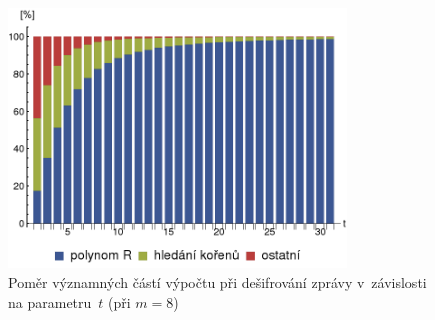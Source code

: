 \documentclass[thesis=M,czech,hidelinks]{FITthesis}[2012/06/26]
\newcommand{\0}{{\textcolor[gray]{0.75}{0}}}
\begin{document}
\begin{figure}[!ht]
    \centering
    \includegraphics[width=0.8\textwidth]{../implementace/grafy/chart_m8_desifrovani.png}
    \caption{
        Poměr významných částí výpočtu při dešifrování zprávy v~závislosti na
        parametru~$t$ (při $m=8$)
    }
    \label{obr_mereni_pomer_desifr}
\end{figure}






\begin{conclusion}
\end{conclusion}




\end{document}
